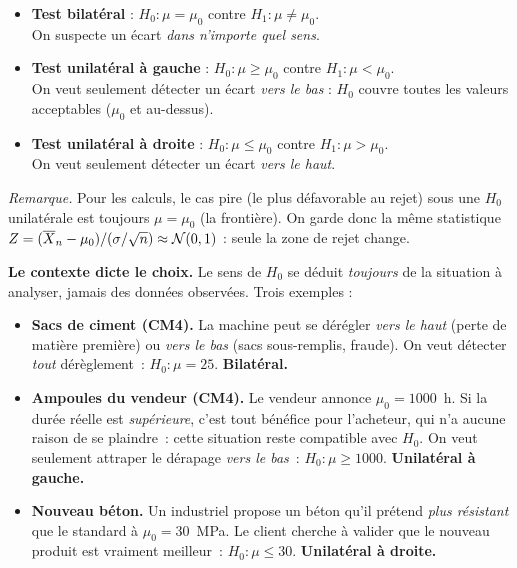 \begin{mdframed}[backgroundcolor=ThemeLight, linecolor=Theme,
  linewidth=1pt, innertopmargin=8pt, innerbottommargin=8pt]
\begin{itemize}\setlength{\itemsep}{0.3em}
  \item \textbf{Test bilatéral} : \quad $H_0 : \mu = \mu_0$ \;\;contre\;\; $H_1 : \mu \neq \mu_0$. \\
  On suspecte un écart \emph{dans n'importe quel sens}.
  \item \textbf{Test unilatéral à gauche} : \quad $H_0 : \mu \ge \mu_0$ \;\;contre\;\; $H_1 : \mu < \mu_0$. \\
  On veut seulement détecter un écart \emph{vers le bas} : $H_0$ couvre toutes les valeurs \og acceptables \fg{} ($\mu_0$ et au-dessus).
  \item \textbf{Test unilatéral à droite} : \quad $H_0 : \mu \le \mu_0$ \;\;contre\;\; $H_1 : \mu > \mu_0$. \\
  On veut seulement détecter un écart \emph{vers le haut}.
\end{itemize}
\end{mdframed}

\smallskip

\textit{Remarque.} Pour les calculs, le cas \og pire \fg{} (le plus défavorable au rejet) sous une $H_0$ unilatérale est toujours $\mu = \mu_0$ (la frontière). On garde donc la même statistique $Z = (\overline{X}_n - \mu_0)/(\sigma/\sqrt n) \approx \mathcal{N}(0,1)$ : seule la zone de rejet change.

\smallskip

\textbf{Le contexte dicte le choix.} Le sens de $H_0$ se déduit \emph{toujours} de la situation à analyser, jamais des données observées. Trois exemples :

\begin{itemize}\setlength{\itemsep}{0.2em}
  \item \textbf{Sacs de ciment (CM4).} La machine peut se dérégler \emph{vers le haut} (perte de matière première) ou \emph{vers le bas} (sacs sous-remplis, fraude). On veut détecter \emph{tout} dérèglement~:
  $H_0 : \mu = 25$. \textbf{Bilatéral.}
  \item \textbf{Ampoules du vendeur (CM4).} Le vendeur annonce $\mu_0 = 1000$~h. Si la durée réelle est \emph{supérieure}, c'est tout bénéfice pour l'acheteur, qui n'a aucune raison de se plaindre~: cette situation reste compatible avec $H_0$. On veut seulement attraper le dérapage \emph{vers le bas}~:
  $H_0 : \mu \ge 1000$. \textbf{Unilatéral à gauche.}
  \item \textbf{Nouveau béton.} Un industriel propose un béton qu'il prétend \emph{plus résistant} que le standard à $\mu_0 = 30$~MPa. Le client cherche à valider que le nouveau produit est vraiment meilleur~:
  $H_0 : \mu \le 30$. \textbf{Unilatéral à droite.}
\end{itemize}

